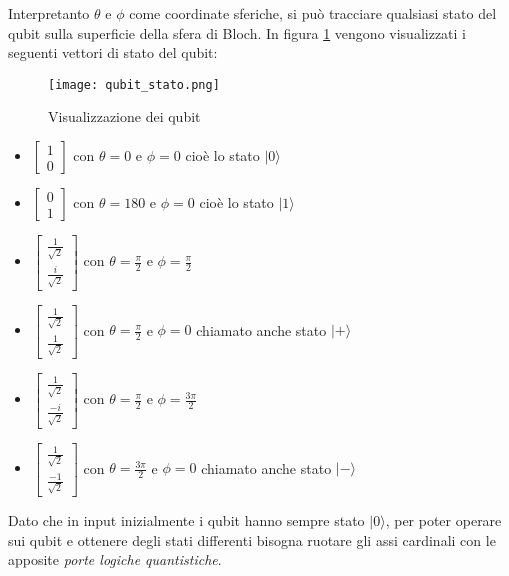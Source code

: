 Interpretanto \(\theta\) e \(\phi\) come coordinate sferiche, si può tracciare qualsiasi stato del qubit sulla superficie della sfera di Bloch. In figura \ref{fig:qubit_stato} vengono visualizzati i seguenti vettori di stato del qubit:

\begin{figure}[h]
  \centering
  \texttt{[image: qubit\_stato.png]}
  \caption{Visualizzazione dei qubit}
  \label{fig:qubit_stato}
\end{figure}

\begin{itemize}
  \item \( \begin{bmatrix} 1 \\ 0 \end{bmatrix} \) con \( \theta = 0 \) e \(\phi = 0\) cioè lo stato \( | 0 \rangle \)
  \item \( \begin{bmatrix} 0 \\ 1 \end{bmatrix} \) con \( \theta = 180 \) e \(\phi = 0\) cioè lo stato \( | 1 \rangle \)
  \item \( \begin{bmatrix} \frac{1}{\sqrt{2}} \\ \frac{i}{\sqrt{2}} \end{bmatrix} \) con \( \theta = \frac{\pi}{2} \) e \( \phi = \frac{\pi}{2} \)
  \item \( \begin{bmatrix} \frac{1}{\sqrt{2}} \\ \frac{1}{\sqrt{2}} \end{bmatrix} \) con \( \theta = \frac{\pi}{2} \) e \( \phi = 0 \) chiamato anche stato \( | + \rangle \)
  \item \( \begin{bmatrix} \frac{1}{\sqrt{2}} \\ \frac{-i}{\sqrt{2}} \end{bmatrix} \) con \( \theta = \frac{\pi}{2} \) e \( \phi = \frac{3\pi}{2} \)
  \item \( \begin{bmatrix} \frac{1}{\sqrt{2}} \\ \frac{-1}{\sqrt{2}} \end{bmatrix} \) con \( \theta = \frac{3\pi}{2} \) e \( \phi = 0 \) chiamato anche stato \( | - \rangle \)
\end{itemize}

Dato che in input inizialmente i qubit hanno sempre stato \( | 0 \rangle \), per poter operare sui qubit e ottenere degli stati differenti bisogna ruotare gli assi cardinali con le apposite \textit{porte logiche quantistiche}.

